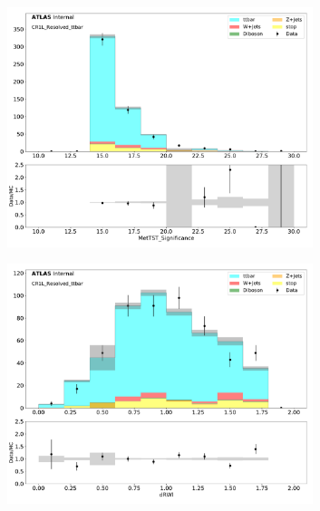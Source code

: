 \begin{figure}[htbp]
\begin{subfigure}{0.49\textwidth}
     \includegraphics[width = 0.98\textwidth]{Figures/4/datamc/CR1L_Resolved_ttbar/MetTST_Significance.pdf}
     \caption{\metsig}
     \end{subfigure}
     \begin{subfigure}{0.49\textwidth}
     \includegraphics[width = 0.98\textwidth]{Figures/4/datamc/CR1L_Resolved_ttbar/dRWl.pdf}
     \caption{\drWl}
     \end{subfigure}
     \begin{subfigure}{0.49\textwidth}

\end{subfigure}
\end{figure}
